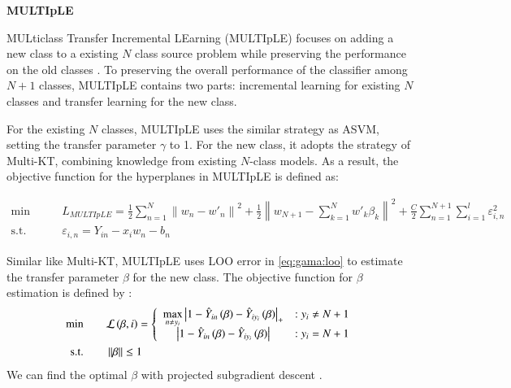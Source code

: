 \textbf{MULTIpLE}

MULticlass Transfer Incremental LEarning (MULTIpLE) focuses on adding a new class to a existing $N$ class source problem while preserving the performance on the old classes \cite{kuzborskij2013n}. To preserving the overall performance of the classifier among $N+1$ classes, MULTIpLE contains two parts: incremental learning for existing $N$ classes and transfer learning for the new class.

For the existing $N$ classes, MULTIpLE uses the similar strategy as ASVM, setting the transfer parameter $\gamma$ to 1. For the new class, it adopts the strategy of Multi-KT, combining knowledge from existing $N$-class models. As a result, the objective function for the hyperplanes in MULTIpLE is defined as:

\begin{equation}
\begin{aligned}
\text{min}\qquad {} & L_{MULTIpLE}=\frac{1}{2}\sum\limits_{n = 1}^N {{{\left\| {{w_n} - {{w'}_n}} \right\|}^2}}  + \frac{1}{2}{\left\| {{w_{N + 1}} - \sum\limits_{k = 1}^N {w{'_k}{\beta _k}} } \right\|^2}+ \frac{C}{2}\sum\limits_{n = 1}^{N + 1} {\sum\limits_{i = 1}^l {\varepsilon _{i,n}^2} }  \\
\text{s.t.}\qquad {} &{\varepsilon _{i,n}} = {Y_{in}} -  {x_i}{w_n} - {b_n}
\end{aligned}\label{eq:gama:multiple}
\end{equation}

Similar like Multi-KT, MULTIpLE uses LOO error in \eqref{eq:gama:loo} to estimate the transfer parameter $\beta$ for the new class. The objective function for $\beta$ estimation is defined by \cite{crammer2002algorithmic}:
\begin{equation}\label{eq:gama:multib}
\begin{aligned}
\text{min} \qquad& {\cal L}\left( {\beta ,i} \right) = \left\{ {\begin{array}{*{20}{c}}
{\mathop {\max }\limits_{n \ne {y_i}} {{\left| {1 - {{\hat Y}_{in}}\left( \beta  \right) - {{\hat Y}_{i{y_i}}}\left( \beta  \right)} \right|}_ + }}&{{:y_i} \ne N + 1}\\
{\left| {1 - {{\hat Y}_{in}}\left( \beta  \right) - {{\hat Y}_{i{y_i}}}\left( \beta  \right)} \right|}&{{:y_i} = N + 1}
\end{array}} \right.  \\
\text{s.t.} \qquad& \left\| \beta  \right\| \le 1
\end{aligned}
\end{equation}
We can find the optimal $\beta$ with projected subgradient descent \cite{BoydCO}. 